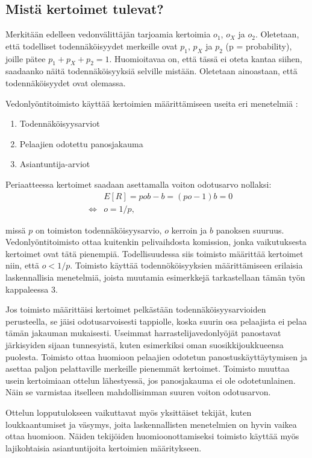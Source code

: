 \documentclass[a4paper,finnish,titlepage,12pt]{article}
\begin{document}
\subsection{Mistä kertoimet tulevat?}
Merkitään edelleen vedonvälittäjän tarjoamia kertoimia $o_1$, $o_X$ ja $o_2$. Oletetaan, että todelliset todennäköisyydet merkeille ovat $p_1$, $p_X$ ja $p_2$ (p = probability), joille pätee $p_1 + p_X + p_2 = 1$. Huomioitavaa on, että tässä ei oteta kantaa siihen, saadaanko näitä todennäköisyyksiä selville mistään. Oletetaan ainoastaan, että todennäköisyydet ovat olemassa.

Vedonlyöntitoimisto käyttää kertoimien määrittämiseen useita eri menetelmiä \cite{odds}:

\begin{enumerate}
  \item Todennäköisyysarviot
  \item Pelaajien odotettu panosjakauma
  \item Asiantuntija-arviot
\end{enumerate}

Periaatteessa kertoimet saadaan asettamalla voiton odotusarvo nollaksi:
\begin{eqnarray}
&& E[R] = p o b - b = (p o - 1) b = 0 \\
&\Leftrightarrow& o = 1 / p,
\end{eqnarray}

missä $p$ on toimiston todennäköisyysarvio, $o$ kerroin ja $b$ panoksen suuruus. Vedonlyöntitoimisto ottaa kuitenkin pelivaihdosta komission, jonka vaikutuksesta kertoimet ovat tätä pienempiä. Todellisuudessa siis toimisto määrittää kertoimet niin, että $o < 1 / p$. Toimisto käyttää todennököisyyksien määrittämiseen erilaisia laskennallisia menetelmiä, joista muutamia esimerkkejä tarkastellaan tämän työn kappaleessa 3.

Jos toimisto määrittäisi kertoimet pelkästään todennäköisyysarvioiden perusteella, se jäisi odotusarvoisesti tappiolle, koska suurin osa pelaajista ei pelaa tämän jakauman mukaisesti. Useimmat harrastelijavedonlyöjät panostavat järkisyiden sijaan tunnesyistä, kuten esimerkiksi oman suosikkijoukkueensa puolesta. Toimisto ottaa huomioon pelaajien odotetun panostuskäyttäytymisen ja asettaa paljon pelattaville merkeille pienemmät kertoimet. Toimisto muuttaa usein kertoimiaan ottelun lähestyessä, jos panosjakauma ei ole odotetunlainen. Näin se varmistaa itselleen mahdollisimman suuren voiton odotusarvon.

Ottelun lopputulokseen vaikuttavat myös yksittäiset tekijät, kuten loukkaantumiset ja väsymys, joita laskennallisten menetelmien on hyvin vaikea ottaa huomioon. Näiden tekijöiden huomioonottamiseksi toimisto käyttää myös lajikohtaisia asiantuntijoita kertoimien määritykseen.
\end{document}

